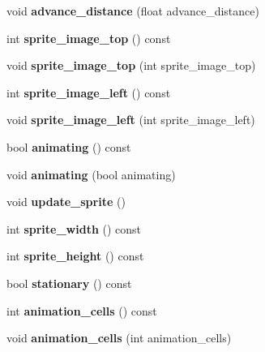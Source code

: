 \begin{DoxyCompactItemize}
\mbox{\label{class_sprite_a91d7d4c46a38c58fa1ef05c4132e5fcf}} 
void {\bfseries advance\+\_\+distance} (float advance\+\_\+distance)
\item 
\mbox{\label{class_sprite_a4482fc0a1581aaf91c97175a79be319a}} 
int {\bfseries sprite\+\_\+image\+\_\+top} () const
\item 
\mbox{\label{class_sprite_a7f5f82520ed2901d7fc89f01d981a49f}} 
void {\bfseries sprite\+\_\+image\+\_\+top} (int sprite\+\_\+image\+\_\+top)
\item 
\mbox{\label{class_sprite_a9a139be20b5b5a5237c9a81b36f625f8}} 
int {\bfseries sprite\+\_\+image\+\_\+left} () const
\item 
\mbox{\label{class_sprite_a92d9872ab695420bc81ede2a9425aeea}} 
void {\bfseries sprite\+\_\+image\+\_\+left} (int sprite\+\_\+image\+\_\+left)
\item 
\mbox{\label{class_sprite_af9153229a8327b4d247ef16448c1cb35}} 
bool {\bfseries animating} () const
\item 
\mbox{\label{class_sprite_a1a3df748d6a3469d1b79cde39adb8ebc}} 
void {\bfseries animating} (bool animating)
\item 
\mbox{\label{class_sprite_a55f3a0b845fc21ff9f0774613124b1e6}} 
void {\bfseries update\+\_\+sprite} ()
\item 
\mbox{\label{class_sprite_acdba2a71fac359258d583bcdc2648cdd}} 
int {\bfseries sprite\+\_\+width} () const
\item 
\mbox{\label{class_sprite_a767f74c47c154fccb06d815a1ba33561}} 
int {\bfseries sprite\+\_\+height} () const
\item 
\mbox{\label{class_sprite_acebb5f6a962000aae733d919e2a6392d}} 
bool {\bfseries stationary} () const
\item 
\mbox{\label{class_sprite_ab05f29a527cec4d079c1ed74c8980d3c}} 
int {\bfseries animation\+\_\+cells} () const
\item 
\mbox{\label{class_sprite_a54ab5cb9dc016b0fc26eb465b3b792c3}} 
void {\bfseries animation\+\_\+cells} (int animation\+\_\+cells)
\end{DoxyCompactItemize}
